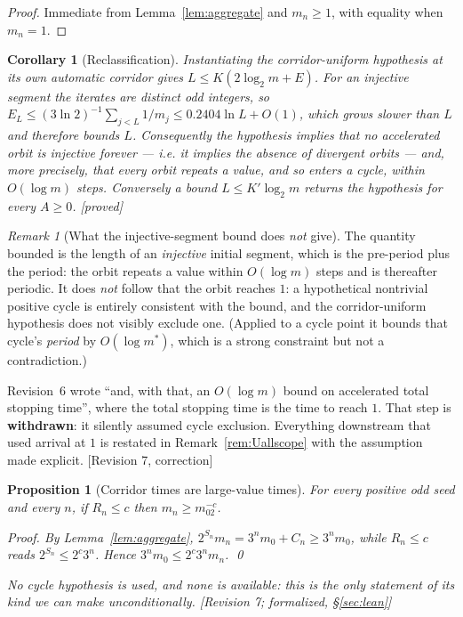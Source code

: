 \documentclass[11pt]{article}
\theoremstyle{plain}
\newtheorem{proposition}[theorem]{Proposition}
\newtheorem{corollary}[theorem]{Corollary}
\theoremstyle{definition}
\theoremstyle{remark}
\newtheorem{remark}[theorem]{Remark}
\newcommand{\status}[1]{\textsf{\footnotesize[#1]}}
\begin{document}
\begin{proof}
Immediate from Lemma~\ref{lem:aggregate} and $m_n\ge1$, with equality when $m_n=1$.
\end{proof}

\begin{corollary}[Reclassification]\label{cor:Uall}
Instantiating the corridor-uniform hypothesis at its own automatic corridor gives
$L\le K(2\log_2 m+E)$. For an injective segment the iterates are distinct odd integers, so
$E_L\le(3\ln2)^{-1}\sum_{j<L}1/m_j\le0.2404\ln L+O(1)$, which grows slower than $L$ and therefore
bounds $L$. Consequently the hypothesis implies that no accelerated orbit is injective forever ---
i.e. it implies the absence of divergent orbits --- and, more precisely, that \emph{every} orbit
repeats a value, and so enters a cycle, within $O(\log m)$ steps. Conversely a bound
$L\le K'\log_2 m$ returns the hypothesis for every $A\ge0$. \status{proved}
\end{corollary}

\begin{remark}[What the injective-segment bound does \emph{not} give]\label{rem:cyclegap}
The quantity bounded is the length of an \emph{injective} initial segment, which is the pre-period
plus the period: the orbit repeats a value within $O(\log m)$ steps and is thereafter periodic. It
does \emph{not} follow that the orbit reaches $1$: a hypothetical nontrivial positive cycle is
entirely consistent with the bound, and the corridor-uniform hypothesis does not visibly exclude
one. (Applied to a cycle point it bounds that cycle's \emph{period} by $O(\log m^*)$, which is a
strong constraint but not a contradiction.)

Revision~6 wrote ``and, with that, an $O(\log m)$ bound on accelerated total stopping time'', where
the total stopping time is the time to reach $1$. That step is \textbf{withdrawn}: it silently
assumed cycle exclusion. Everything downstream that used arrival at $1$ is restated in
Remark~\ref{rem:Uallscope} with the assumption made explicit. \status{Revision 7, correction}
\end{remark}

\begin{proposition}[Corridor times are large-value times]\label{prop:corridorvalue}
For every positive odd seed and every $n$, if $R_n\le c$ then $m_n\ge m_02^{-c}$.

\emph{Proof.} By Lemma~\ref{lem:aggregate}, $2^{S_n}m_n=3^nm_0+C_n\ge3^nm_0$, while $R_n\le c$
reads $2^{S_n}\le2^{c}3^n$. Hence $3^nm_0\le2^{c}3^nm_n$. \qed

No cycle hypothesis is used, and none is available: this is the only statement of its kind we can
make unconditionally. \status{Revision 7; formalized, \S\ref{sec:lean}}
\end{proposition}
\end{document}
